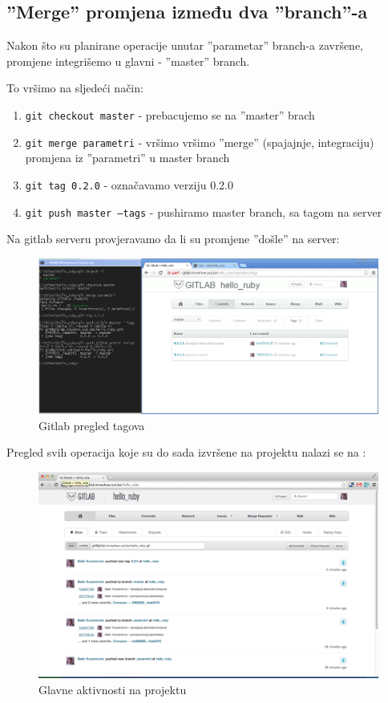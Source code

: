 \documentclass[times, utf8, seminar]{fit}
\begin{document}
\subsection{''Merge'' promjena između dva ''branch''-a}

Nakon što su planirane operacije unutar ''parametar'' branch-a završene, promjene integrišemo u glavni - ''master'' branch.

To vršimo na sljedeći način:
\begin{enumerate}
  \item \texttt{git checkout master} - prebacujemo se na ''master'' brach
  \item \texttt{git merge parametri} - vršimo vršimo ''merge'' (spajajnje, integraciju) promjena iz ''parametri'' u  master branch
  \item \texttt{git tag 0.2.0} - označavamo verziju 0.2.0
  \item \texttt{git push master --tags} - pushiramo master branch, sa tagom na server
\end{enumerate}

Na gitlab serveru provjeravamo da li su promjene ''došle'' na server:

\begin{figure}[H]
\centering
\includegraphics[width=16cm]{img/gitlab_tags.png}
\caption{Gitlab pregled tagova}
\end{figure}

Pregled svih operacija koje su do sada izvršene na projektu nalazi se na \href{https://gitlab.knowhow.out.ba/hello\_ruby}{\color{blue}{URL-u projekta}}:

\begin{figure}[H]
\centering
\includegraphics[width=15cm]{img/gitlab_project_show.png}
\caption{Glavne aktivnosti na projektu}
\end{figure}
\end{document}
